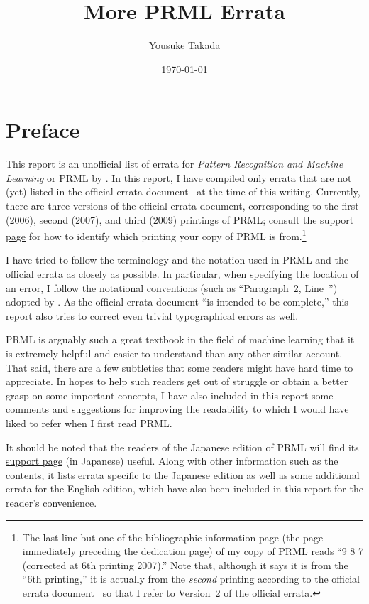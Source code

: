\documentclass[12pt,a4paper]{article}
\title{More PRML Errata}
\author{Yousuke Takada \\ \email{yousuketakada@gmail.com}}
\date{\today}
\newcommand{\Section}[1]{%
\section*{#1}
\addcontentsline{toc}{section}{#1}}
\begin{document}
\maketitle

\Section{Preface}
This report is an unofficial list of errata for \emph{Pattern Recognition and Machine Learning} or
PRML by \citet*{Bishop:PRML}.
In this report, I have compiled only errata
that are not (yet) listed in the official errata document~\citep{Svensen:PRML_errata}
at the time of this writing.
Currently, there are three versions of the official errata document,
corresponding to the first (2006), second (2007), and third (2009) printings of PRML;
consult the
\href{https://www.microsoft.com/en-us/research/people/cmbishop/\#prml-book}{support page}
for how to identify which printing your copy of PRML is from.\footnote{%
The last line but one of the bibliographic information page
(the page immediately preceding the dedication page) of my copy of PRML
reads ``9 8 7 (corrected at 6th printing 2007).''
Note that, although it says it is from the ``6th printing,''
it is actually from the \emph{second} printing according to
the official errata document~\citep{Svensen:PRML_errata}
so that I refer to Version~2 of the official errata.}

I have tried to follow the terminology and the notation used in PRML and the official errata
as closely as possible.
In particular, when specifying the location of an error,
I follow the notational conventions (such as ``Paragraph~2, Line~'')
adopted by \citet{Svensen:PRML_errata}.
As the official errata document ``is intended to be complete,''
this report also tries to correct even trivial typographical errors as well.

PRML is arguably such a great textbook in the field of machine learning
that it is extremely helpful and easier to understand than any other similar account.
That said, there are a few subtleties
that some readers might have hard time to appreciate.
In hopes to help such readers get out of struggle or
obtain a better grasp on some important concepts,
I have also included in this report some comments and suggestions for improving the readability
to which I would have liked to refer when I first read PRML.

It should be noted that the readers of the Japanese edition of PRML will find its
\href{http://ibisforest.org/index.php?PRML}{support page} (in Japanese) useful.
Along with other information such as the contents,
it lists errata specific to the Japanese edition as well as
some additional errata for the English edition,
which have also been included in this report for the reader's convenience.
\end{document}
